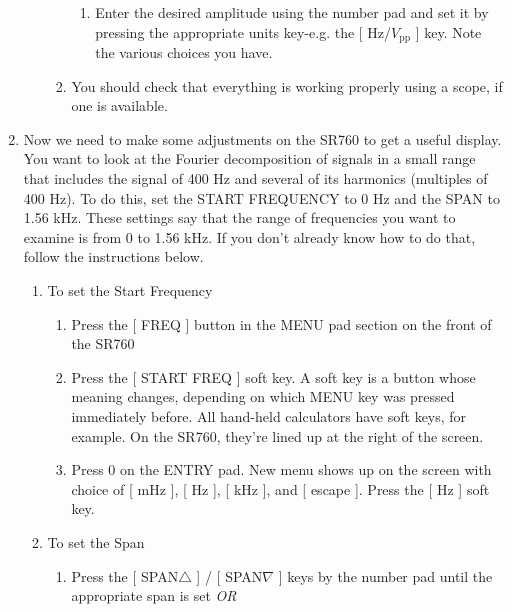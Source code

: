 \documentclass{../lab}
\begin{document}
\begin{enumerate}
\begin{itemize}
\begin{enumerate}
\begin{enumerate}
                \item Enter the desired amplitude using the number pad and set it by pressing the appropriate units key-e.g. the [ Hz/$V_\text{pp}$ ] key. Note the various choices you have.

            \end{enumerate}

            \item You should check that everything is working properly using a scope, if one is available.

        \end{enumerate}

    \end{itemize}

    \item Now we need to make some adjustments on the SR760 to get a useful display. You want to look at the Fourier decomposition of signals in a small range that includes the signal of 400 Hz and several of its harmonics (multiples of 400 Hz). To do this, set the START FREQUENCY to 0 Hz and the SPAN to 1.56 kHz. These settings say that the range of frequencies you want to examine is from 0 to 1.56 kHz. If you don't already know how to do that, follow the instructions below.
    \begin{enumerate}
        \item To set the Start Frequency
        \begin{enumerate}
            \item Press the [ FREQ ] button in the MENU pad section on the front of the SR760

            \item Press the [ START FREQ ] soft key. A soft key is a button whose meaning changes, depending on which MENU key was pressed immediately before. All hand-held calculators have soft keys, for example. On the SR760, they're lined up at the right of the screen.

            \item Press 0 on the ENTRY pad. New menu shows up on the screen with choice of [ mHz ], [ Hz ], [ kHz ], and [ escape ]. Press the [ Hz ] soft key.

        \end{enumerate}

        \item To set the Span
        \begin{enumerate}
            \item Press the [ SPAN$\triangle$ ] / [ SPAN$\nabla$ ] keys by the number pad until the appropriate span is set \emph{OR}


\end{enumerate}
\end{enumerate}
\end{enumerate}
\end{document}
